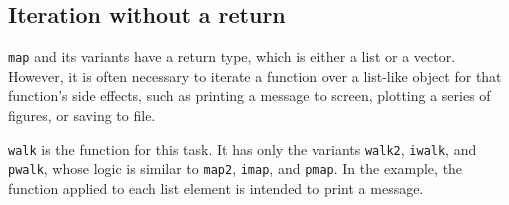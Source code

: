 \documentclass[]{book}
\newenvironment{Shaded}{}{}
\newcommand{\CommentTok}[1]{\textcolor[rgb]{0.38,0.63,0.69}{\textit{#1}}}
\newcommand{\ControlFlowTok}[1]{\textcolor[rgb]{0.00,0.44,0.13}{\textbf{#1}}}
\newcommand{\DecValTok}[1]{\textcolor[rgb]{0.25,0.63,0.44}{#1}}
\newcommand{\KeywordTok}[1]{\textcolor[rgb]{0.00,0.44,0.13}{\textbf{#1}}}
\newcommand{\NormalTok}[1]{#1}
\newcommand{\OperatorTok}[1]{\textcolor[rgb]{0.40,0.40,0.40}{#1}}
\newcommand{\StringTok}[1]{\textcolor[rgb]{0.25,0.44,0.63}{#1}}
\begin{document}
\begin{Shaded}
\end{Shaded}

\hypertarget{iteration-without-a-return}{%
\subsection{Iteration without a return}\label{iteration-without-a-return}}

\texttt{map} and its variants have a return type, which is either a list or a vector.
However, it is often necessary to iterate a function over a list-like object for that function's side effects, such as printing a message to screen, plotting a series of figures, or saving to file.

\texttt{walk} is the function for this task. It has only the variants \texttt{walk2}, \texttt{iwalk}, and \texttt{pwalk}, whose logic is similar to \texttt{map2}, \texttt{imap}, and \texttt{pmap}. In the example, the function applied to each list element is intended to print a message.

\begin{Shaded}
\end{Shaded}
\end{document}
